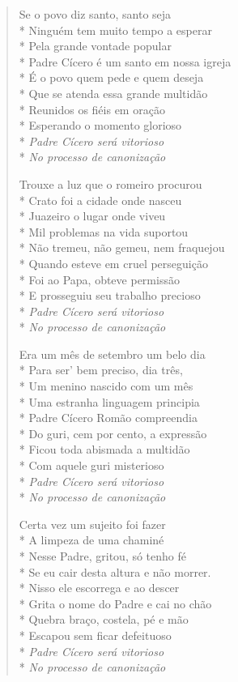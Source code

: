 \begin{verse}
Se o povo diz santo, santo seja\\*
Ninguém tem muito tempo a esperar\\*
Pela grande vontade popular\\*
Padre Cícero é um santo em nossa igreja\\*
É o povo quem pede e quem deseja\\*
Que se atenda essa grande multidão\\*
Reunidos os fiéis em oração\\*
Esperando o momento glorioso\\*
\textit{Padre Cícero será vitorioso}\\*
\textit{No processo de canonização}

Trouxe a luz que o romeiro procurou\\*
Crato foi a cidade onde nasceu\\*
Juazeiro o lugar onde viveu\\*
Mil problemas na vida suportou\\*
Não tremeu, não gemeu, nem fraquejou\\*
Quando esteve em cruel perseguição\\*
Foi ao Papa, obteve permissão\\*
E prosseguiu seu trabalho precioso\\*
\textit{Padre Cícero será vitorioso}\\*
\textit{No processo de canonização}

Era um mês de setembro um belo dia\\*
Para ser' bem preciso, dia três,\\*
Um menino nascido com um mês\\*
Uma estranha linguagem principia\\*
Padre Cícero Romão compreendia\\*
Do guri, cem por cento, a expressão\\*
Ficou toda abismada a multidão\\*
Com aquele guri misterioso\\*
\textit{Padre Cícero será vitorioso}\\*
\textit{No processo de canonização}

Certa vez um sujeito foi fazer\\*
A limpeza de uma chaminé\\*
Nesse Padre, gritou, só tenho fé\\*
Se eu cair desta altura e não morrer.\\*
Nisso ele escorrega e ao descer\\*
Grita o nome do Padre e cai no chão\\*
Quebra braço, costela, pé e mão\\*
Escapou sem ficar defeituoso\\*
\textit{Padre Cícero será vitorioso}\\*
\textit{No processo de canonização}


\end{verse}
